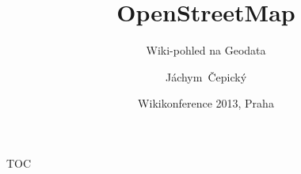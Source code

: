 \documentclass[xcolor=dvipsnames]{beamer}
\title[OpenStreetMap] %
{OpenStreetMap}
\subtitle {Wiki-pohled na Geodata}
\author[J. Čepický] %
{Jáchym~Čepický\inst{1}\inst{2}}
\institute %
{
  \inst{1}%
  Open Source Geospatial Foundation
  \url{http://osgeo.org}\\

  \inst{2}%
  Geosense s.r.o.
  \url{http://geosense.cz}\\
}
\date[] %
{Wikikonference 2013, Praha}
\begin{document}
\begin{frame}
  \titlepage
\end{frame}

\begin{frame}{TOC}
  \tableofcontents
\end{frame}




\end{document}
